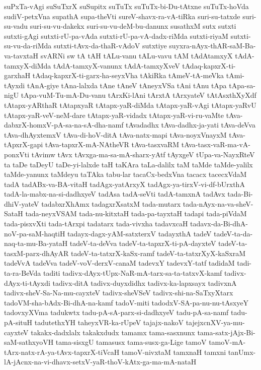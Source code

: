 {suPxTa-vAgi
suSuTxrX
suSupitx
suTuTx
suTuTx-bi-Du-tAtxne
suTuTx-hoVda
sudiV-petxVna
supathA
supa-theVti
sureV-shavx-ra-vA-tiRka
suri-su-tatxde
suri-su-vadu
suri-su-vu-dakekx
suri-su-vu-deM-bu-danunx
susathxM
sutx
sutxti
sutxti-gAgi
sutxti-rU-pa-vAda
sutxti-rU-pa-vA-dadx-riMda
sutxti-riyaM
sutxti-su-vu-da-riMda
sutxti-tAvx-da-thaR-vAdoV
sutxtiye
suyxra-nAyx-thAR-saM-Ba-va-tavxtaH
svARNi
sw
tA
tAH
tALu-vanu
tALu-vavu
tAM
tAdAtamxyX
tAdA-tamxyX-diMda
tAdA-tamxyX-vanunx
tAdA-tamxyXveV
tAdaq-kapxrX-ti-garxhaH
tAdaq-kapxrX-ti-garx-ha-seyxVha
tAkiRka
tAmeV-tA-meVka
tAmi-tAyxdi
tAnA-giye
tAna-lalxda
tAne
tAneV
tAneyxVSa
tAni
tAnu
tApa
tApa-sa-nigU
tApa-vuM-Tu-mA-Du-vanu
tArxKi-lAni
tArxtA
tArxyateV
tAtAsxthXyXdf
tAtapx-yARthaR
tAtapxyaR
tAtapx-yaR-diMda
tAtapx-yaR-vAgi
tAtapx-yaRvU
tAtapx-yaR-veV-neM-dare
tAtapx-yaR-vidadx
tAtapx-yaR-vi-ru-vaMte
tAva-dabxrX-homxV-pA-sa-na-sA-dha-namf
tAvadadhx
tAva-dadhx-ja-yati
tAva-deVva
tAva-dhAyxtemxV
tAva-di-hoV-ditA
tAva-natx-mapi
tAva-noyxVnayxM
tAva-tApxrX-gapi
tAva-tapxrX-mA-NAtheVR
tAva-tasxvaRM
tAva-tasx-vaR-ma-vA-ponxVti
tAvimw
tAvx
tAvxga-ma-sa-mA-sharx-yAtf
tAyxgeV
tUpa-va-NayxRteV
ta
taDe
taDeyU
taDe-yi-lalxde
taH
taKAra
taLa-dalilx
taM
taMde
taMde-yalilx
taMde-yanunx
taMdeyu
taTAka
tabu-lar
tacaCx-bedxVna
tacacx
tacecxVdaM
tadA
tadABx-va-BA-vitaH
tadAgx-yatArxyX
tadAgx-ya-tirxV-vi-df-bUrxthA
tadA-la-mabx-na-si-dadhxyeV
tadAsa
tadA-seVti
tadA-tamxnA
tadAvx
tada-Bi-dhiV-yateV
tadabxrXhAmx
tadagxrXsatxM
tada-mutarx
tada-nAyx-na-va-sheV-SataH
tada-neyxVSAM
tada-nu-kitxtaH
tada-pa-tayxtaH
tadapi
tada-piVdaM
tada-pisxvXti
tada-tArxpi
tadatarx
tada-vivxha
tadavxcaH
tadavx-da-Bi-dhA-noV-pa-saM-haqtiH
tadayx-dagx-yAM-satxterxV
tadayxthA
tadeV
tadeV-ta-da-naq-ta-mu-Ba-yataH
tadeV-ta-deVva
tadeV-ta-tapxrX-ti-pA-dayxteV
tadeV-ta-tasxM-parx-dhAyAR
tadeV-ta-tatxrX-kaSx-ramf
tadeV-ta-tatxrXyX-kaSxraM
tadeVvA
tadeVva
tadeV-voV-derxV-canaM
tadevxY
tadevxY-tatf
tadidaM
tadi-ta-ra-BeVda
taditi
tadivx-dAyx-tUpx-NaR-mA-tarx-sa-ta-tatxvX-kamf
tadivx-dAyx-ti-tAyxdi
tadivx-ditA
tadivx-duyxdidhx
tadivx-ka-lapxsayx
tadivxnA
tadivx-sheV-Sa-Na-mu-cayxteV
tadivx-sheVSeV
tadivx-shi-na-SaTxyXtarx
tadoVM-sha-bAdx-Bi-dhA-na-kamf
tadoV-miti
tadodxV-SA-pa-nu-nu-tAsxyeY
tadovxyXVma
tadukwtx
tadu-pA-sA-parx-si-dadhxyeV
tadu-pA-sa-namf
tadu-pA-situH
tadutethxYH
taheyxVR-ka-rUpeV
tajajx-nakoV
tajejxcnXV-ya-mu-cayxteV
takakx-dadxlalx
takakxdudx
tamamx
tama-sasxnunx
tama-satx-jAjx-Bi-saM-sathxyoVH
tama-sisxgU
tamasusx
tama-susx-ga-Lige
tamoV
tamoV-mA-tArx-natx-rA-ya-tAvx-tapxrX-tiVcaH
tamoV-nivxtaM
tamxnaH
tamxni
tanUmx-lA-jAcnx-na-vi-dhavx-setxV-yaR-thoV-kAtx-ga-ma-mA-nataH
}
